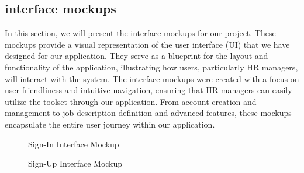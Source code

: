 \newpage
\subsection{interface mockups}
In this section, we will present the interface mockups for our project. These mockups provide a visual representation of the user interface (UI) that we have designed for our application. They serve as a blueprint for the layout and functionality of the application, illustrating how users, particularly HR managers, will interact with the system. The interface mockups were created with a focus on user-friendliness and intuitive navigation, ensuring that HR managers can easily utilize the  toolset through our application. From account creation and management to job description definition and advanced features, these mockups encapsulate the entire user journey within our application.

\begin{figure}[H]
    \centering
    \caption{ Sign-In Interface Mockup }
    \label{fig:Sign-In-Interface-Mockup}
\end{figure}

\begin{figure}[H]
    \centering
    \caption{ Sign-Up Interface Mockup }
    \label{fig:Sign-Up-Interface-Mockup}
\end{figure}

